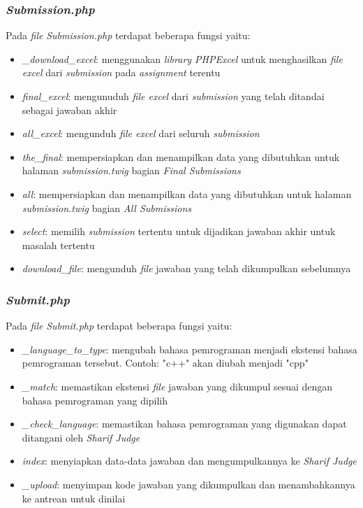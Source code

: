 \subsubsection{\textit{Submission.php}}
Pada \textit{file} \textit{Submission.php} terdapat beberapa fungsi yaitu:
\begin{itemize}
	\item \textit{\_download\_excel}: menggunakan \textit{library PHPExcel} untuk menghasilkan \textit{file excel} dari \textit{submission} pada \textit{assignment} terentu
	\item \textit{final\_excel}: mengunuduh \textit{file excel} dari \textit{submission} yang telah ditandai sebagai jawaban akhir
	\item \textit{all\_excel}: mengunduh \textit{file excel} dari seluruh \textit{submission}
	\item \textit{the\_final}: mempersiapkan dan menampilkan data yang dibutuhkan untuk halaman \textit{submission.twig} bagian \textit{Final Submissions}
	\item \textit{all}: mempersiapkan dan menampilkan data yang dibutuhkan untuk halaman \textit{submission.twig} bagian \textit{All Submissions}
	\item \textit{select}: memilih \textit{submission} tertentu untuk dijadikan jawaban akhir untuk masalah tertentu
	\item \textit{download\_file}: mengunduh \textit{file} jawaban yang telah dikumpulkan sebelumnya
\end{itemize}

\subsubsection{\textit{Submit.php}}
Pada \textit{file} \textit{Submit.php} terdapat beberapa fungsi yaitu:
\begin{itemize}
	\item \textit{\_language\_to\_type}: mengubah bahasa pemrograman menjadi ekstensi bahasa pemrograman tersebut. Contoh: "c++" akan diubah menjadi "cpp"
	\item \textit{\_match}: memastikan ekstensi \textit{file} jawaban yang dikumpul sesuai dengan bahasa pemrograman yang dipilih
	\item \textit{\_check\_language}: memastikan bahasa pemrograman yang digunakan dapat ditangani oleh \textit{Sharif Judge}
	\item \textit{index}: menyiapkan data-data jawaban dan mengumpulkannya ke \textit{Sharif Judge}
	\item \textit{\_upload}: menyimpan kode jawaban yang dikumpulkan dan menambahkannya ke antrean untuk dinilai
\end{itemize}

